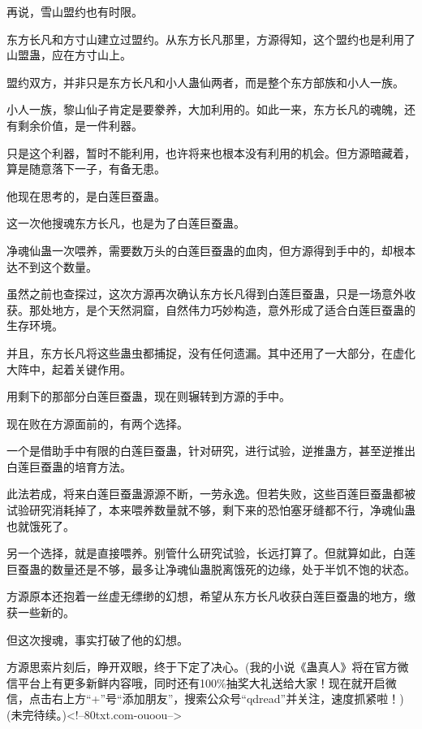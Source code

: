 \begin{this_body}
再说，雪山盟约也有时限。

东方长凡和方寸山建立过盟约。从东方长凡那里，方源得知，这个盟约也是利用了山盟蛊，应在方寸山上。

盟约双方，并非只是东方长凡和小人蛊仙两者，而是整个东方部族和小人一族。

小人一族，黎山仙子肯定是要豢养，大加利用的。如此一来，东方长凡的魂魄，还有剩余价值，是一件利器。

只是这个利器，暂时不能利用，也许将来也根本没有利用的机会。但方源暗藏着，算是随意落下一子，有备无患。

他现在思考的，是白莲巨蚕蛊。

这一次他搜魂东方长凡，也是为了白莲巨蚕蛊。

净魂仙蛊一次喂养，需要数万头的白莲巨蚕蛊的血肉，但方源得到手中的，却根本达不到这个数量。

虽然之前也查探过，这次方源再次确认东方长凡得到白莲巨蚕蛊，只是一场意外收获。那处地方，是个天然洞窟，自然伟力巧妙构造，意外形成了适合白莲巨蚕蛊的生存环境。

并且，东方长凡将这些蛊虫都捕捉，没有任何遗漏。其中还用了一大部分，在虚化大阵中，起着关键作用。

用剩下的那部分白莲巨蚕蛊，现在则辗转到方源的手中。

现在败在方源面前的，有两个选择。

一个是借助手中有限的白莲巨蚕蛊，针对研究，进行试验，逆推蛊方，甚至逆推出白莲巨蚕蛊的培育方法。

此法若成，将来白莲巨蚕蛊源源不断，一劳永逸。但若失败，这些百莲巨蚕蛊都被试验研究消耗掉了，本来喂养数量就不够，剩下来的恐怕塞牙缝都不行，净魂仙蛊也就饿死了。

另一个选择，就是直接喂养。别管什么研究试验，长远打算了。但就算如此，白莲巨蚕蛊的数量还是不够，最多让净魂仙蛊脱离饿死的边缘，处于半饥不饱的状态。

方源原本还抱着一丝虚无缥缈的幻想，希望从东方长凡收获白莲巨蚕蛊的地方，缴获一些新的。

但这次搜魂，事实打破了他的幻想。

方源思索片刻后，睁开双眼，终于下定了决心。(我的小说《蛊真人》将在官方微信平台上有更多新鲜内容哦，同时还有100\%抽奖大礼送给大家！现在就开启微信，点击右上方“+”号“添加朋友”，搜索公众号“qdread”并关注，速度抓紧啦！)(未完待续。)<!--80txt.com-ouoou-->

\end{this_body}

